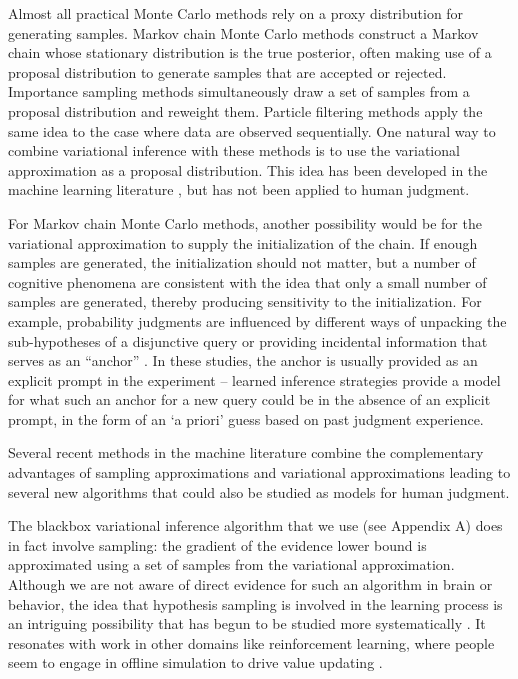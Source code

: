 Almost all practical Monte Carlo methods rely on a proxy distribution for generating samples. Markov chain Monte Carlo methods construct a Markov chain whose stationary distribution is the true posterior, often making use of a proposal distribution to generate samples that are accepted or rejected. Importance sampling methods simultaneously draw a set of samples from a proposal distribution and reweight them. Particle filtering methods apply the same idea to the case where data are observed sequentially. One natural way to combine variational inference with these methods is to use the variational approximation as a proposal distribution. This idea has been developed in the machine learning literature \citep[e.g.,][]{de2001variational,gu2015neural}, but has not been applied to human judgment.

For Markov chain Monte Carlo methods, another possibility would be for the variational approximation to supply the initialization of the chain. If enough samples are generated, the initialization should not matter, but a number of cognitive phenomena are consistent with the idea that only a small number of samples are generated, thereby producing sensitivity to the initialization. For example, probability judgments are influenced by different ways of unpacking the sub-hypotheses of a disjunctive query \citep{dasgupta2017hypotheses} or providing incidental information that serves as an ``anchor'' \citep{lieder2017anchoring,lieder2018empirical}. In these studies, the anchor is usually provided as an explicit prompt in the experiment -- learned inference strategies provide a model for what such an anchor for a new query could be in the absence of an explicit prompt, in the form of an `a priori' guess based on past judgment experience.

Several recent methods in the machine literature combine the complementary advantages of sampling approximations and variational approximations leading to several new algorithms \citep{li2017approximate, naesseth2017variational, ruiz2019contrast} that could also be studied as models for human judgment.

The blackbox variational inference algorithm that we use (see Appendix A) does in fact involve sampling: the gradient of the evidence lower bound is approximated using a set of samples from the variational approximation. Although we are not aware of direct evidence for such an algorithm in brain or behavior, the idea that hypothesis sampling is involved in the learning process is an intriguing possibility that has begun to be studied more systematically \citep{bramley2017formalizing,bramley2018grounding,rule2018learning}. It resonates with work in other domains like reinforcement learning, where people seem to engage in offline simulation to drive value updating \citep{gershman2014retrospective,gershman2017imaginative,momennejad2018offline}.

